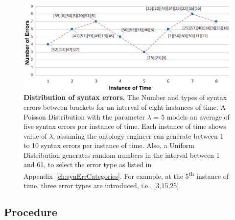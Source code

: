 \begin{figure}[ht]
	\begin{center}
		\includegraphics[width=1\linewidth,angle=0]{images/Experiment02-01.png}
		\vspace*{-3mm}
		\caption{\textbf{Distribution of syntax errors.} The Number and types of syntax errors between brackets for an interval of eight instances of time. 
		A Poisson Distribution with the parameter $\lambda$ = 5 models an average of five syntax errors per instance of time. 
		Each instance of time shows value of $\lambda$, assuming the ontology engineer can generate between 1 to 10 syntax errors per instance of time. 
		Also, a Uniform Distribution generates random numbers in the interval between 1 and 61, to select the error type as listed in Appendix~\ref{ch:synErrCategories}. 
		For example, at the 5\textsuperscript{th} instance of time, three error types are introduced, i.e., [3,15,25].} 
		\label{Fig:experiment2}
	\end{center}
\end{figure}

\subsection{Procedure}

